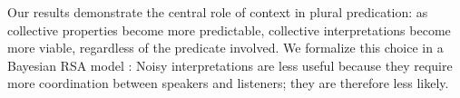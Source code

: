 \documentclass[11pt]{article}
\begin{document}
Our results demonstrate the central role of context in plural predication: as collective properties become more predictable, collective interpretations become more viable, regardless of the predicate involved. We formalize this choice in a Bayesian RSA model \citep{frankgoodman2012,lassitergoodman2013}: Noisy interpretations are less useful because they require more coordination between speakers and listeners; they are therefore less likely.


		




\newpage



\end{document}
